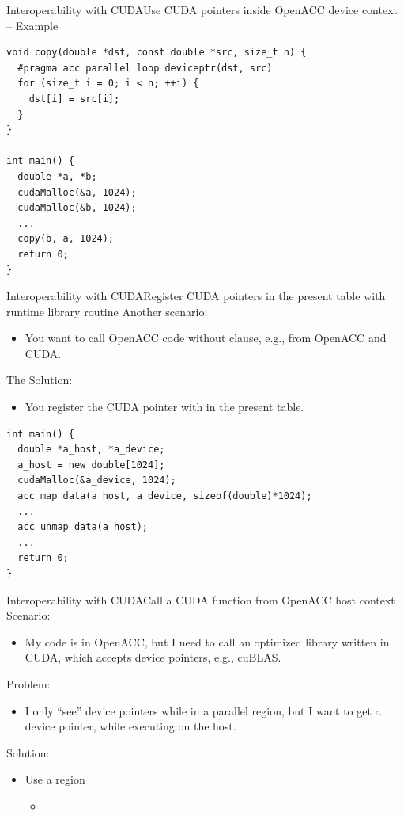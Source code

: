 \documentclass[12pt,aspectratio=169]{beamer}
\begin{document}
\begin{frame}[fragile]{Interoperability with CUDA}{Use CUDA pointers inside OpenACC device context -- Example}
  \begin{lstlisting}[style=CppStyle]
void copy(double *dst, const double *src, size_t n) {
  #pragma acc parallel loop deviceptr(dst, src)
  for (size_t i = 0; i < n; ++i) {
    dst[i] = src[i];
  }
}

int main() {
  double *a, *b;
  cudaMalloc(&a, 1024);
  cudaMalloc(&b, 1024);
  ...
  copy(b, a, 1024);
  return 0;
}
  \end{lstlisting}
\end{frame}

\begin{frame}[fragile]{Interoperability with CUDA}{Register CUDA pointers in the present table with runtime library routine}
  Another scenario:
  \begin{itemize}
  \item You want to call OpenACC code without  clause, e.g., from OpenACC and CUDA.
  \end{itemize}
  \vfill
  The Solution:
  \begin{itemize}
  \item You register the CUDA pointer with  in the present table.
  \end{itemize}
  \begin{lstlisting}[style=CppStyle]
int main() {
  double *a_host, *a_device;
  a_host = new double[1024];
  cudaMalloc(&a_device, 1024);
  acc_map_data(a_host, a_device, sizeof(double)*1024);
  ...
  acc_unmap_data(a_host);
  ...
  return 0;
}
  \end{lstlisting}
\end{frame}

\begin{frame}[fragile]{Interoperability with CUDA}{Call a CUDA function from OpenACC host context}
  Scenario:
  \begin{itemize}
  \item My code is in OpenACC, but I need to call an optimized library written in CUDA, which accepts device pointers, e.g., cuBLAS.
  \end{itemize}
  \pause
  Problem:
  \begin{itemize}
  \item I only ``see'' device pointers while in a parallel region, but I want to get a device pointer, while executing on the host.
  \end{itemize}
  \pause
  Solution:
  \begin{itemize}
  \item Use a  region
    \begin{itemize}
    \item {}
    \end{itemize}
  \end{itemize}
\end{frame}
\end{document}
